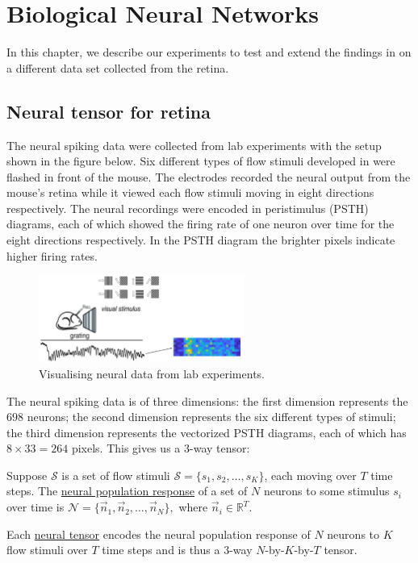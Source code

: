 \chapter{Biological Neural Networks} 
\label{chapter-biological} 

In this chapter, we describe our experiments to test and extend the findings in \cite{dyballa_manifold_2021} on a different  data set collected from the retina.

\section{Neural tensor for retina}
The neural spiking data \cite{dyballa_manifold_2021} were collected from lab experiments with the setup shown in the figure below. Six different types of flow stimuli developed in \cite{visual-flow} were flashed in front of the mouse. The electrodes recorded the neural output from the mouse's retina while it viewed each flow stimuli moving in eight directions respectively. The neural recordings were encoded in peristimulus (PSTH) diagrams, each of which showed the firing rate of one neuron over time for the eight directions respectively. In the PSTH diagram the brighter pixels indicate higher firing rates.
\begin{figure}[H]
    \centering
        \includegraphics[width=0.6\textwidth]{figures/biological/biological-input-output.jpg}
        \caption{Visualising neural data from lab experiments.}
\end{figure}

\par The neural spiking data is of three dimensions: the first dimension represents the $698$ neurons; the second dimension represents the six different types of stimuli; the third dimension represents the vectorized PSTH diagrams, each of which has $8\times 33 = 264$ pixels. This gives us a $3$-way tensor:

\begin{defn}
    Suppose $\mathcal{S}$ is a set of flow stimuli $\mathcal{S} = \{s_1, s_2,\dots, s_K\}$, each moving over  $T$ time steps. The \underline{neural population response} of a set of $N$ neurons to some stimulus $s_i$ over time is $\mathcal{N} = \{\vec{n}_1, \vec{n}_2, \dots, \vec{n}_N\},$ where $\vec{n}_i \in \mathbb{R}^{T}$. 

    Each \underline{neural tensor} encodes the neural population response of $N$ neurons to $K$ flow stimuli over $T$ time steps and is thus a $3$-way $N$-by-$K$-by-$T$ tensor.
\end{defn}


